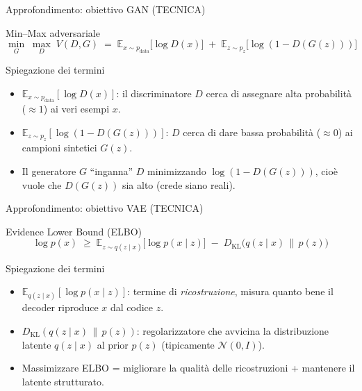 \documentclass[12pt]{beamer}
\begin{document}
\begin{frame}{Approfondimento: obiettivo GAN (TECNICA) }
  \begin{alertblock}{Min–Max adversariale}
    \[
      \min_{G}\;\max_{D}\;
      V(D,G) \;=\;
      \mathbb{E}_{x\sim p_{\mathrm{data}}}\bigl[\log D(x)\bigr]
      \;+\;
      \mathbb{E}_{z\sim p_z}\bigl[\log(1 - D(G(z)))\bigr]
    \]
  \end{alertblock}
  \begin{alertblock}{Spiegazione dei termini}
    \begin{itemize}
      \item \(\mathbb{E}_{x\sim p_{\mathrm{data}}}[\log D(x)]\): il discriminatore \(D\) cerca di assegnare alta probabilità (\(\approx1\)) ai veri esempi \(x\).  
      \item \(\mathbb{E}_{z\sim p_z}[\log(1 - D(G(z)))]\): \(D\) cerca di dare bassa probabilità (\(\approx0\)) ai campioni sintetici \(G(z)\).  
      \item Il generatore \(G\) “inganna” \(D\) minimizzando \(\log(1 - D(G(z)))\), cioè vuole che \(D(G(z))\) sia alto (crede siano reali).
    \end{itemize}
  \end{alertblock}
\end{frame}


\begin{frame}{Approfondimento: obiettivo VAE (TECNICA) }
  \begin{alertblock}{Evidence Lower Bound (ELBO)}
    \[
      \log p(x)\;\ge\;
      \mathbb{E}_{z\sim q(z\mid x)}\bigl[\log p(x\mid z)\bigr]
      \;-\;
      D_{\mathrm{KL}}\bigl(q(z\mid x)\,\|\,p(z)\bigr)
    \]
  \end{alertblock}
  \begin{alertblock}{Spiegazione dei termini}
    \begin{itemize}
      \item \(\mathbb{E}_{q(z\mid x)}[\log p(x\mid z)]\): termine di \emph{ricostruzione}, misura quanto bene il decoder riproduce \(x\) dal codice \(z\).  
      \item \(D_{\mathrm{KL}}(q(z\mid x)\,\|\,p(z))\): regolarizzatore che avvicina la distribuzione latente \(q(z\mid x)\) al prior \(p(z)\) (tipicamente \(\mathcal{N}(0,I)\)).  
      \item Massimizzare ELBO = migliorare la qualità delle ricostruzioni + mantenere il latente strutturato.
    \end{itemize}
  \end{alertblock}
\end{frame}
\end{document}
